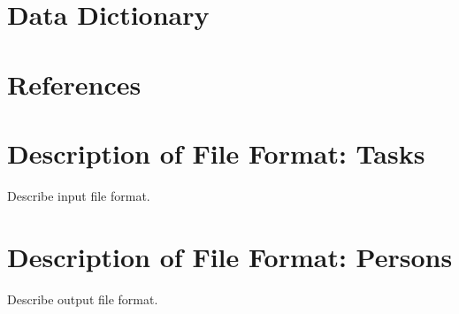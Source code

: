 \documentclass[12pt]{article}
\begin{document}


\section{Data Dictionary}

\section{References}

\appendix

\section{Description of File Format: Tasks}

Describe input file format.

\section{Description of File Format: Persons}

Describe output file format.
\end{document}

